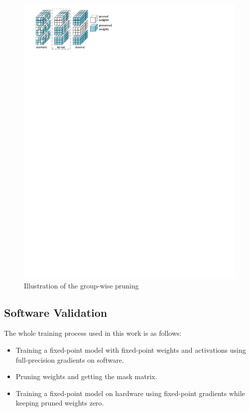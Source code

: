 \begin{figure}[tb]
    \centering
    \includegraphics[width=0.9\columnwidth]{figures/prune.pdf}
    \caption{Illustration of the group-wise pruning}\label{fig:prune}
\end{figure}



\subsection{Software Validation}

The whole training process used in this work is as follows:
\begin{itemize}
\item Training a fixed-point model with fixed-point weights and activations using full-precision gradients on software.
\item Pruning weights and getting the mask matrix.
\item Training a fixed-point model on hardware using fixed-point gradients while keeping pruned weights zero.
\end{itemize}

